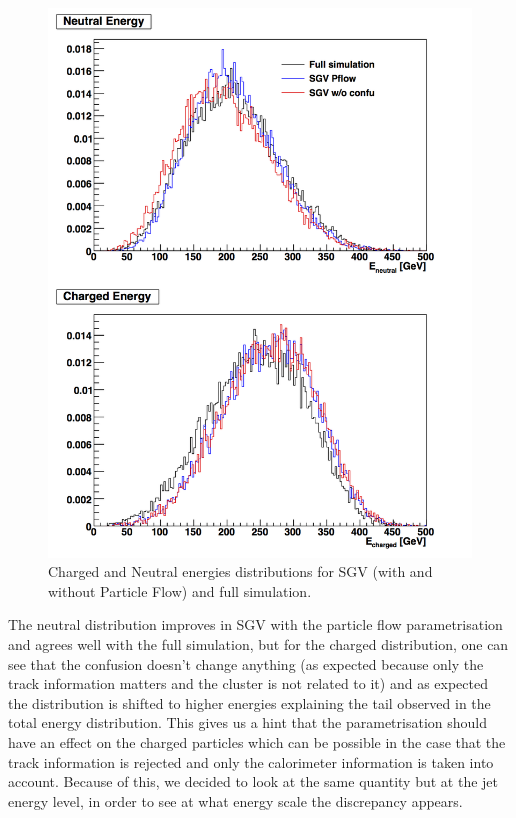 \begin{figure}[t]
  \centering
  \includegraphics[scale=0.5]{chap6/fig_SGV/Total_EneuEcha_notjet.png}
  \caption{Charged and Neutral energies distributions for SGV (with and without Particle Flow) and full simulation.}
  \label{fig:energies2}
\end{figure}

The neutral distribution improves in SGV with the particle flow parametrisation and agrees well with the full simulation, but for the charged distribution, one can see that the confusion doesn't change anything (as expected because only the track information matters and the cluster is not related to it) and as expected the distribution is shifted to higher energies explaining the tail observed in the total energy distribution. This gives us a hint that the parametrisation should have an effect on the charged particles which can be possible in the case that the track information is rejected and only the calorimeter information is taken into account.
Because of this, we decided to look at the same quantity but at the jet energy level, in order to see at what energy scale the discrepancy appears.

